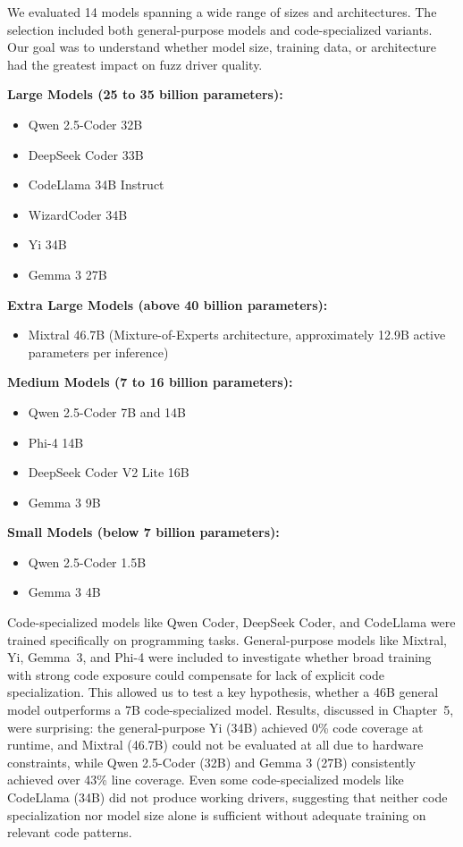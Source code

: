 We evaluated 14 models spanning a wide range of sizes and architectures. The selection included both general-purpose models and code-specialized variants. Our goal was to understand whether model size, training data, or architecture had the greatest impact on fuzz driver quality.

\textbf{Large Models (25 to 35 billion parameters):}
\begin{itemize}
    \item Qwen 2.5-Coder 32B
    \item DeepSeek Coder 33B
    \item CodeLlama 34B Instruct
    \item WizardCoder 34B
    \item Yi 34B
    \item Gemma 3 27B
\end{itemize}

\textbf{Extra Large Models (above 40 billion parameters):}
\begin{itemize}
    \item Mixtral 46.7B (Mixture-of-Experts architecture, approximately 12.9B active parameters per inference)
\end{itemize}

\textbf{Medium Models (7 to 16 billion parameters):}
\begin{itemize}
    \item Qwen 2.5-Coder 7B and 14B
    \item Phi-4 14B
    \item DeepSeek Coder V2 Lite 16B
    \item Gemma 3 9B
\end{itemize}

\textbf{Small Models (below 7 billion parameters):}
\begin{itemize}
    \item Qwen 2.5-Coder 1.5B
    \item Gemma 3 4B
\end{itemize}

Code-specialized models like Qwen Coder, DeepSeek Coder, and CodeLlama were trained specifically on programming tasks. General-purpose models like Mixtral, Yi, Gemma~3, and Phi-4 were included to investigate whether broad training with strong code exposure could compensate for lack of explicit code specialization. This allowed us to test a key hypothesis, whether a 46B general model outperforms a 7B code-specialized model. Results, discussed in Chapter~5, were surprising: the general-purpose Yi (34B) achieved 0\% code coverage at runtime, and Mixtral (46.7B) could not be evaluated at all due to hardware constraints, while Qwen 2.5-Coder (32B) and Gemma 3 (27B) consistently achieved over 43\% line coverage. Even some code-specialized models like CodeLlama (34B) did not produce working drivers, suggesting that neither code specialization nor model size alone is sufficient without adequate training on relevant code patterns.

